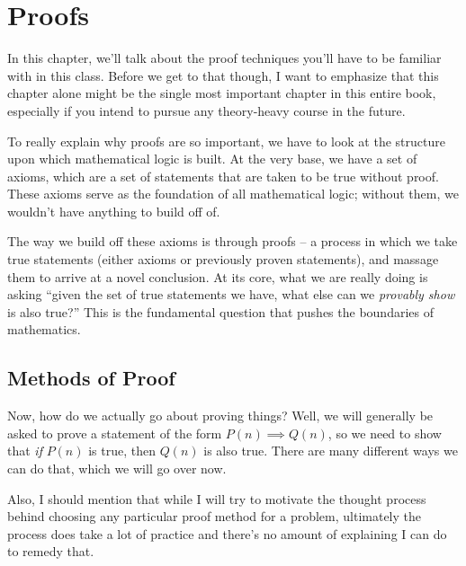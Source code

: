 \chapter{Proofs}
In this chapter, we'll talk about the proof techniques you'll have to be familiar with in this class. Before we get
to that though, I want to emphasize that this chapter alone might be the single most important chapter in this 
entire book, especially if you intend to pursue any theory-heavy course in the future. 

To really explain why proofs are so important, we have to look at the structure upon which mathematical logic 
is built. At the very base, we have a set of axioms, which are a set of statements that are taken 
to be true without proof. These axioms serve as the foundation of all mathematical logic; without them, we 
wouldn't have anything to build off of.  

The way we build off these axioms is through proofs -- a process in which we take true statements (either 
axioms or previously proven statements), and massage them to arrive at a novel conclusion. At its core, 
what we are really doing is asking ``given the set of true statements we have, what else can we 
\textit{provably show} is also true?'' This is the fundamental question that pushes the boundaries of mathematics.

\section{Methods of Proof}
Now, how do we actually go about proving things? Well, we will generally be asked to prove a statement of the 
form \( P(n) \implies Q(n) \), so we need to show that \textit{if} \( P(n) \) is true, then \( Q(n) \) is also true. 
There are many different ways we can do that, which we will go over now. 

Also, I should mention that while I will try to motivate the thought process behind choosing any particular 
proof method for a problem, ultimately the process does take a lot of practice and there's no amount of 
explaining I can do to remedy that.  

